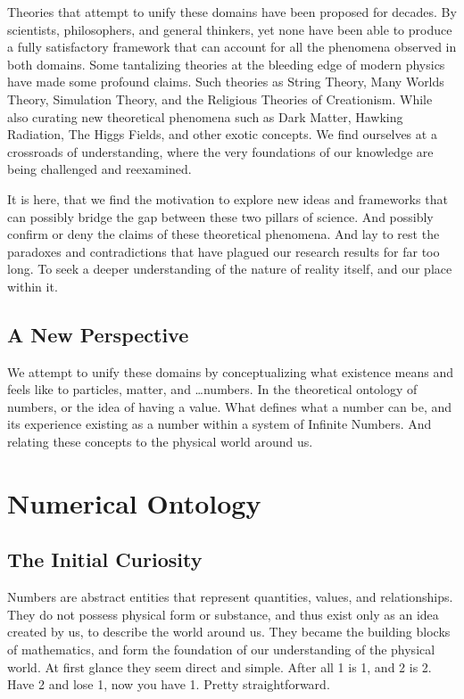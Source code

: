 \documentclass[11pt]{article}
\newcommand{\headertext}{}
\begin{document}
        Theories that attempt to unify these domains have been proposed for decades.
        By scientists, philosophers, and general thinkers, yet none have been able to produce a fully satisfactory framework that can account for all the phenomena observed in both domains.
        Some tantalizing theories at the bleeding edge of modern physics have made some profound claims.
        Such theories as String Theory, Many Worlds Theory, Simulation Theory, and the Religious Theories of Creationism.
        While also curating new theoretical phenomena such as Dark Matter, Hawking Radiation, The Higgs Fields, and other exotic concepts.
        We find ourselves at a crossroads of understanding, where the very foundations of our knowledge are being challenged and reexamined.

        It is here, that we find the motivation to explore new ideas and frameworks that can possibly bridge the gap between these two pillars of science.
        And possibly confirm or deny the claims of these theoretical phenomena.
        And lay to rest the paradoxes and contradictions that have plagued our research results for far too long.
        To seek a deeper understanding of the nature of reality itself, and our place within it.

    \subsection{A New Perspective}
        \hspace{1em}
        We attempt to unify these domains by conceptualizing what existence means and feels like to particles, matter, and \dots numbers.
        In the theoretical ontology of numbers, or the idea of having a value.
        What defines what a number can be, and its experience existing as a number within a system of Infinite Numbers.
        And relating these concepts to the physical world around us.
\newpage

\section{Numerical Ontology}
    \renewcommand{\headertext}{(TECH: PoPE)\hspace{1em} SS-3: \hspace{1em}Numerical Ontology}
    \subsection{The Initial Curiosity}
        \hspace{1em}
        Numbers are abstract entities that represent quantities, values, and relationships.
        They do not possess physical form or substance, and thus exist only as an idea created by us, to describe the world around us.
        They became the building blocks of mathematics, and form the foundation of our understanding of the physical world.
        At first glance they seem direct and simple. After all 1 is 1, and 2 is 2. Have 2 and lose 1, now you have 1. Pretty straightforward.
\end{document}
